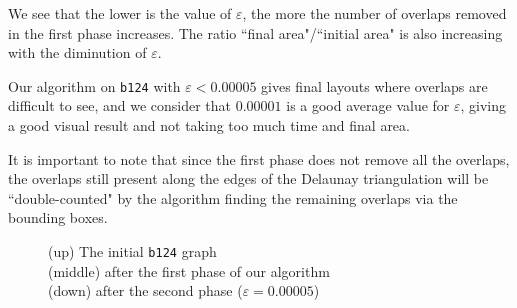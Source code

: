 \documentclass[12pt]{report}
\begin{document}
\bigskip
We see that the lower is the value of $\varepsilon$, the more the number of overlaps removed in the first phase increases. The ratio ``final area"/``initial area" is also increasing with the diminution of $\varepsilon$.

Our algorithm on \texttt{b124} with $\varepsilon < 0.00005$ gives final layouts where overlaps are difficult to see, and we consider that $0.00001$ is a good average value for $\varepsilon$, giving a good visual result and not taking too much time and final area.

\bigskip
It is important to note that since the first phase does not remove all the overlaps, the overlaps still present along the edges of the Delaunay triangulation will be ``double-counted" by the algorithm finding the remaining overlaps via the bounding boxes. 

\begin{figure}[h]
	\center
  \setlength\fboxsep{5pt}
  \setlength\fboxrule{0.5pt}
  
  
  
  \caption{(up) The initial \texttt{b124} graph \\ (middle) after the first phase of our algorithm \\ (down) after the second phase ($\varepsilon = 0.00005$)}
  \label{b124}
\end{figure}
\end{document}
